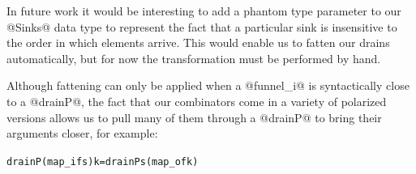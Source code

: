 In future work it would be interesting to add a phantom type parameter to our @Sinks@ data type to represent the fact that a particular sink is insensitive to the order in which elements arrive. This would enable us to fatten our drains automatically, but for now the transformation must be performed by hand.

Although fattening can only be applied when a @funnel_i@ is syntactically close to a @drainP@, the fact that our combinators come in a variety of polarized versions allows us to pull many of them through a @drainP@ to bring their arguments closer, for example:
\begin{alltt}
  drainP (map_i f s) k  =  drainP s (map_o f k)
\end{alltt}

